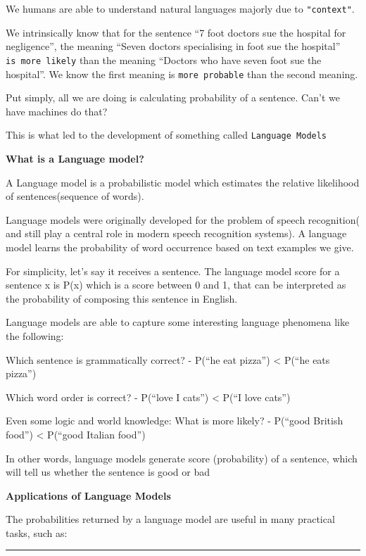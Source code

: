 \documentclass[11pt]{article}
\begin{document}
We humans are able to understand natural languages majorly due to
\texttt{"context"}.

We intrinsically know that for the sentence ``7 foot doctors sue the
hospital for negligence'', the meaning ``Seven doctors specialising in
foot sue the hospital'' \texttt{is\ more\ likely} than the meaning
``Doctors who have seven foot sue the hospital''. We know the first
meaning is \texttt{more\ probable} than the second meaning.

Put simply, all we are doing is calculating probability of a sentence.
Can't we have machines do that?

This is what led to the development of something called
\texttt{Language\ Models}

\textbf{What is a Language model?}

A Language model is a probabilistic model which estimates the relative
likelihood of sentences(sequence of words).

Language models were originally developed for the problem of speech
recognition( and still play a central role in modern speech recognition
systems). A language model learns the probability of word occurrence
based on text examples we give.

For simplicity, let's say it receives a sentence. The language model
score for a sentence x is P(x) which is a score between 0 and 1, that
can be interpreted as the probability of composing this sentence in
English.

Language models are able to capture some interesting language phenomena
like the following:

Which sentence is grammatically correct? - P(``he eat pizza'')
\textless{} P(``he eats pizza'')

Which word order is correct? - P(``love I cats'') \textless{} P(``I love
cats'')

Even some logic and world knowledge: What is more likely? - P(``good
British food'') \textless{} P(``good Italian food'')

In other words, language models generate score (probability) of a
sentence, which will tell us whether the sentence is good or bad

\textbf{Applications of Language Models}

The probabilities returned by a language model are useful in many
practical tasks, such as:

\begin{center}\rule{0.5\linewidth}{\linethickness}\end{center}
\end{document}
